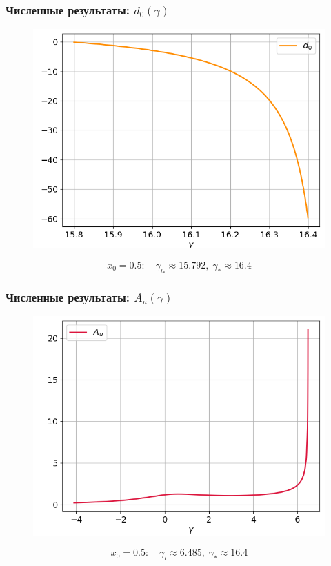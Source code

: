 \documentclass[fullscreen=true, unicode, bookmarks=false]{beamer}
\begin{document}
\begin{frame}
\frametitle{ Численные результаты: $ d_0(\gamma) $ }

\begin{figure} 
\includegraphics[scale=0.55]{divergent_d0_12_3.png}  
\end{figure}

$$ x_0 = 0.5: \quad \gamma_{l_*} \approx 15.792, \; \gamma_* \approx 16.4 $$

\end{frame}

\begin{frame}
\frametitle{ Численные результаты: $ A_u(\gamma) $ }

\begin{figure} 
\includegraphics[scale=0.55]{divergent_amplitude_12_1.png}  
\end{figure}

$$ x_0 = 0.5: \quad \gamma_l \approx 6.485, \; \gamma_* \approx 16.4 $$

\end{frame}
\end{document}
